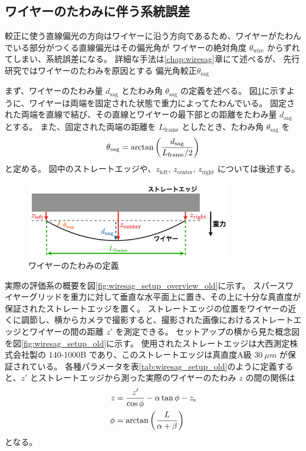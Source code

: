 \documentclass[../../main.tex]{subfiles}
\begin{document}
\subsection{ワイヤーのたわみに伴う系統誤差}
\label{subsec:wg_wiresag}
較正に使う直線偏光の方向はワイヤーに沿う方向であるため、ワイヤーがたわんでいる部分がつくる直線偏光はその偏光角が
ワイヤーの絶対角度 $\theta_{\mathrm{wire}}$ からずれてしまい、系統誤差になる。
詳細な手法は\ref{chap:wiresag}章にて述べるが、
先行研究\cite{swg:murata}\cite{swg:iijima}ではワイヤーのたわみを原因とする
偏光角較正$\theta_{\mathrm{sag}}$

まず、ワイヤーのたわみ量 $d_{\mathrm{sag}}$ とたわみ角 $\theta_{\mathrm{sag}}$ の定義を述べる。
図\ref{fig:wiresag_def}に示すように、ワイヤーは両端を固定された状態で重力によってたわんでいる。
固定された両端を直線で結び、その直線とワイヤーの最下部との距離をたわみ量 $d_{\mathrm{sag}}$ とする。
また、固定された両端の距離を $L_{\mathrm{frame}}$ としたとき、たわみ角 $\theta_{\mathrm{sag}}$ を
\begin{equation}
    \theta_{\mathrm{sag}} = \arctan\qty(\dfrac{d_{\mathrm{sag}}}{L_{\mathrm{frame}}/2})
\end{equation}
と定める。
図中のストレートエッジや、$z_{\text{left}},\,z_{\text{center}},\,z_{\text{right}}$ については後述する。
\begin{figure}[H]
    \centering
    \includegraphics[width=0.8\textwidth]{wiregrid/wiresag_def.pdf}
    \caption{ワイヤーのたわみの定義}
    \label{fig:wiresag_def}
\end{figure}
実際の評価系の概要を図\ref{fig:wiresag_setup_overview_old}に示す。
スパースワイヤーグリッドを重力に対して垂直な水平面上に置き、その上に十分な真直度が保証されたストレートエッジを置く。
ストレートエッジの位置をワイヤーの近くに調節し、横からカメラで撮影すると、撮影された画像におけるストレートエッジとワイヤーの間の距離 $z'$ を測定できる。
セットアップの横から見た概念図を図\ref{fig:wiresag_setup_old}に示す。
使用されたストレートエッジは大西測定株式会社製の 140-1000B であり、このストレートエッジは真直度A級 $\SI{30}{\mu m}$ が保証されている。
各種パラメータを表\ref{tab:wiresag_setup_old}のように定義すると、$z'$ とストレートエッジから測った実際のワイヤーのたわみ $z$ の間の関係は
\begin{align}
    z &= \dfrac{z'}{\cos\phi} - \alpha\tan\phi - z_{\mathrm{s}} \\
    \phi &= \arctan\qty(\dfrac{L}{\alpha+\beta})
\end{align}
となる。
\end{document}
